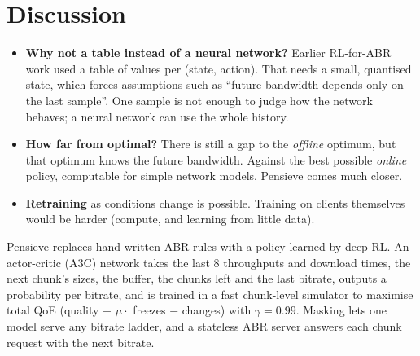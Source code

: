 \section{Discussion}
\begin{itemize}
  \item \textbf{Why not a table instead of a neural network?} Earlier RL-for-ABR work used a table of values per (state, action). That needs a small,
        quantised state, which forces assumptions such as ``future bandwidth depends only on the last sample''. One sample is not enough to judge how
        the network behaves; a neural network can use the whole history.
  \item \textbf{How far from optimal?} There is still a gap to the \emph{offline} optimum, but that optimum knows the future bandwidth. Against the best
        possible \emph{online} policy, computable for simple network models, Pensieve comes much closer.
  \item \textbf{Retraining} as conditions change is possible. Training on clients themselves would be harder (compute, and learning from little data).
\end{itemize}

\begin{keybox}
Pensieve replaces hand-written ABR rules with a policy learned by deep RL. An actor-critic (A3C) network takes the last 8 throughputs and download
times, the next chunk's sizes, the buffer, the chunks left and the last bitrate, outputs a probability per bitrate, and is trained in a fast chunk-level
simulator to maximise total QoE (quality $-$ $\mu \cdot$ freezes $-$ changes) with $\gamma = 0.99$. Masking lets one model serve any bitrate ladder,
and a stateless ABR server answers each chunk request with the next bitrate.
\end{keybox}

